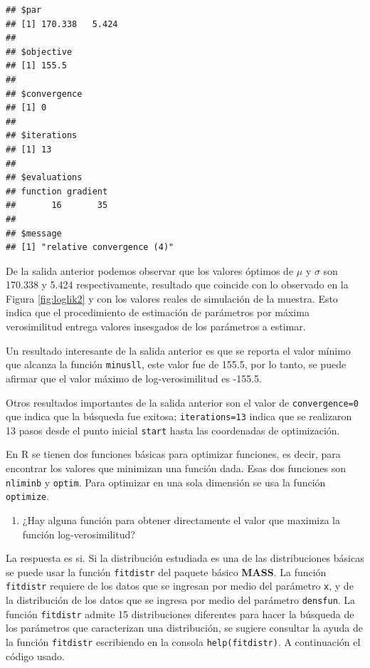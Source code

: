 \documentclass[10pt,]{krantz}
\providecommand{\tightlist}{%
  \setlength{\itemsep}{0pt}\setlength{\parskip}{0pt}}
\let\proglang=\textsf
\let\BeginKnitrBlock\begin \let\EndKnitrBlock\end
\begin{document}
\begin{verbatim}
## $par
## [1] 170.338   5.424
## 
## $objective
## [1] 155.5
## 
## $convergence
## [1] 0
## 
## $iterations
## [1] 13
## 
## $evaluations
## function gradient 
##       16       35 
## 
## $message
## [1] "relative convergence (4)"
\end{verbatim}

De la salida anterior podemos observar que los valores óptimos de
\(\mu\) y \(\sigma\) son 170.338 y 5.424 respectivamente, resultado que
coincide con lo observado en la Figura \ref{fig:loglik2} y con los
valores reales de simulación de la muestra. Esto indica que el
procedimiento de estimación de parámetros por máxima verosimilitud
entrega valores insesgados de los parámetros a estimar.

Un resultado interesante de la salida anterior es que se reporta el
valor mínimo que alcanza la función \texttt{minusll}, este valor fue de
155.5, por lo tanto, se puede afirmar que el valor máximo de
log-verosimilitud es -155.5.

Otros resultados importantes de la salida anterior son el valor de
\texttt{convergence=0} que indica que la búsqueda fue exitosa;
\texttt{iterations=13} indica que se realizaron 13 pasos desde el punto
inicial \texttt{start} hasta las coordenadas de optimización.

\BeginKnitrBlock{rmdnote}
En \proglang{R} se tienen dos funciones básicas para optimizar
funciones, es decir, para encontrar los valores que minimizan una
función dada. Esas dos funciones son \texttt{nliminb} y \texttt{optim}.
Para optimizar en una sola dimensión se usa la función
\texttt{optimize}.
\EndKnitrBlock{rmdnote}

\begin{enumerate}
\def\labelenumi{\arabic{enumi})}
\setcounter{enumi}{3}
\tightlist
\item
  ¿Hay alguna función para obtener directamente el valor que maximiza la
  función log-verosimilitud?
\end{enumerate}

La respuesta es si. Si la distribución estudiada es una de las
distribuciones básicas se puede usar la función \texttt{fitdistr} del
paquete básico \textbf{MASS}. La función \texttt{fitdistr} requiere de
los datos que se ingresan por medio del parámetro \texttt{x}, y de la
distribución de los datos que se ingresa por medio del parámetro
\texttt{densfun}. La función \texttt{fitdistr} admite 15 distribuciones
diferentes para hacer la búsqueda de los parámetros que caracterizan una
distribución, se sugiere consultar la ayuda de la función
\texttt{fitdistr} escribiendo en la consola \texttt{help(fitdistr)}. A
continuación el código usado. 
\end{document}
